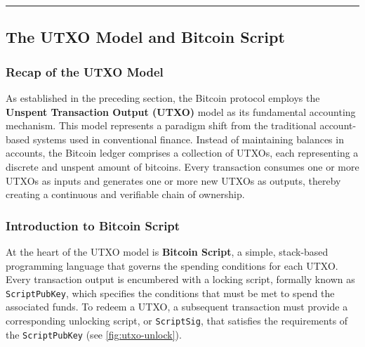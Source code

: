 \begin{center}\rule{0.5\linewidth}{0.5pt}\end{center}

\subsection{The UTXO Model and Bitcoin
	Script}\label{section-1-the-utxo-model-and-bitcoin-script}

\subsubsection{Recap of the UTXO
	Model}\label{recap-of-the-utxo-model}

As established in the preceding section, the Bitcoin protocol employs
the \textbf{Unspent Transaction Output (UTXO)} model as its fundamental
accounting mechanism. This model represents a paradigm shift from the
traditional account-based systems used in conventional finance. Instead
of maintaining balances in accounts, the Bitcoin ledger comprises a
collection of UTXOs, each representing a discrete and unspent amount of
bitcoins. Every transaction consumes one or more UTXOs as inputs and
generates one or more new UTXOs as outputs, thereby creating a
continuous and verifiable chain of ownership.

\subsubsection{Introduction to Bitcoin
	Script}\label{introduction-to-bitcoin-script}

At the heart of the UTXO model is \textbf{Bitcoin Script}, a simple,
stack-based programming language that governs the spending conditions
for each UTXO. Every transaction output is encumbered with a locking
script, formally known as \texttt{ScriptPubKey}, which specifies the
conditions that must be met to spend the associated funds. To redeem a
UTXO, a subsequent transaction must provide a corresponding unlocking
script, or \texttt{ScriptSig}, that satisfies the requirements of the
\texttt{ScriptPubKey} (see \autoref{fig:utxo-unlock}).


